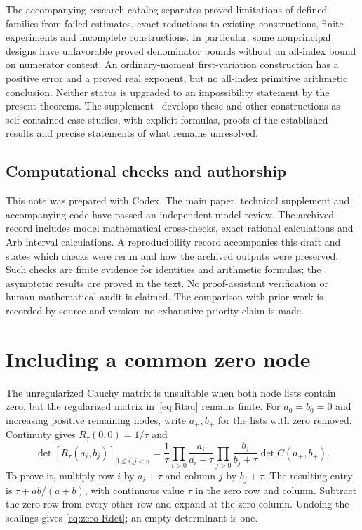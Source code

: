 \documentclass[11pt]{article}
\theoremstyle{definition}
\theoremstyle{remark}
\numberwithin{equation}{section}
\begin{document}
The accompanying research catalog separates proved limitations of defined
families from failed estimates, exact reductions to existing constructions,
finite experiments and incomplete constructions. In particular, some
nonprincipal designs have unfavorable proved denominator bounds without
an all-index bound on numerator content. An ordinary-moment first-variation
construction has a positive error and a proved real exponent, but no
all-index primitive arithmetic conclusion. Neither status is upgraded
to an impossibility statement by the present theorems.
The supplement~\cite{Supplement} develops these and other constructions
as self-contained case studies, with explicit formulas, proofs of the
established results and precise statements of what remains unresolved.

\subsection*{Computational checks and authorship}

This note was prepared with Codex. The main paper, technical supplement
and accompanying code have passed an independent model review.
The archived record includes model
mathematical cross-checks, exact rational calculations and Arb interval
calculations. A reproducibility record accompanies this draft and states
which checks were rerun and how the archived outputs were preserved.
Such checks are finite evidence for identities and arithmetic formulas;
the asymptotic results are proved in the text. No proof-assistant
verification or human mathematical audit is claimed. The comparison with
prior work is recorded by source and version; no exhaustive priority claim
is made.

\appendix
\section{Including a common zero node}\label{app:zero}

The unregularized Cauchy matrix is unsuitable when both node lists contain
zero, but the regularized matrix in~\eqref{eq:Rtau} remains finite. For
$a_0=b_0=0$ and increasing positive remaining nodes, write $a_+,b_+$ for
the lists with zero removed. Continuity gives $R_\tau(0,0)=1/\tau$ and
\begin{equation}\label{eq:zero-Rdet}
 \det[R_\tau(a_i,b_j)]_{0\leq i,j<n}
 =\frac1\tau\prod_{i>0}\frac{a_i}{a_i+\tau}
              \prod_{j>0}\frac{b_j}{b_j+\tau}\det C(a_+,b_+).
\end{equation}
To prove it, multiply row $i$ by $a_i+\tau$ and column $j$ by $b_j+\tau$.
The resulting entry is $\tau+ab/(a+b)$, with continuous value $\tau$
in the zero row and column. Subtract the zero row from every other row
and expand at the zero column. Undoing the scalings gives
\eqref{eq:zero-Rdet}; an empty determinant is one.
\end{document}

